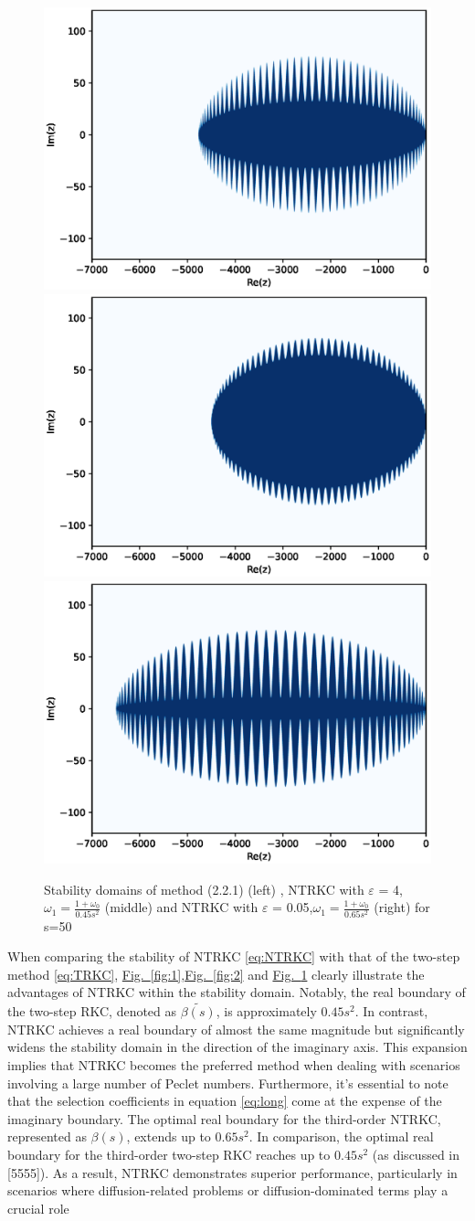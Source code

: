 \documentclass[review,fleqn]{elsarticle}
\newcommand{\figref}[1]{\hyperref[#1]{Fig.~\ref*{#1}}}
\begin{document}
\begin{figure}[ht]
    \centering
    \includegraphics[width=0.3\linewidth]{stable_domians/twostepRKCs100.eps}
    \hfill
    \includegraphics[width=0.3\linewidth]{stable_domians/NTRCKs100wide.eps}
    \hfill
    \includegraphics[width=0.3\linewidth]{stable_domians/NTRCKs100long.eps}
    \caption{Stability domains of method (2.2.1) (left) , NTRKC  with $\varepsilon$ = 4,$\omega_1=\frac{1+\omega_0}{0.45s^2}$ (middle) and  NTRKC  with $\varepsilon$ = 0.05,$\omega_1=\frac{1+\omega_0}{0.65s^2}$ (right) for s=50}
    \label{fig:3}
\end{figure}


When comparing the stability of NTRKC \eqref{eq:NTRKC} with that of the two-step method \eqref{eq:TRKC},  \figref{fig:1},\figref{fig:2} and \figref{fig:3} clearly illustrate the advantages of NTRKC within the stability domain. Notably, the real boundary of the two-step RKC, denoted as $\tilde{\beta(s)}$, is approximately $0.45s^2$.
 In contrast, NTRKC achieves a real boundary of almost the same magnitude but significantly widens the stability domain in the direction of the imaginary axis. This expansion implies that NTRKC becomes the preferred method when dealing with scenarios involving a large number of Peclet numbers.
Furthermore, it's essential to note that the selection coefficients in equation \eqref{eq:long} come at the expense of the imaginary boundary. The optimal real boundary for the third-order NTRKC, represented as $\beta(s)$, extends up to $0.65s^2$. 
In comparison, the optimal real boundary for the third-order two-step RKC reaches up to $0.45s^2$ (as discussed in [5555]). As a result, NTRKC demonstrates superior performance, particularly in scenarios where diffusion-related problems or diffusion-dominated terms play a crucial role
\end{document}
